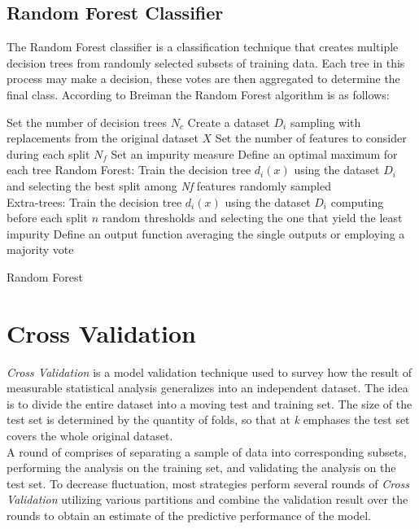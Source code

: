 \documentclass[a4paper, 11pt,titlepage,oneside,openany]{book}
\begin{document}
\subsection{Random Forest Classifier}
The Random Forest classifier is a classification technique that creates multiple decision trees from randomly selected subsets of training data. Each tree in this process may make a decision, these votes are then aggregated to determine the final class. According to Breiman \cite{randomforest} the Random Forest algorithm is as follows:\\

\begin{algorithm}[H]
	\DontPrintSemicolon
	Set the number of decision trees $N_c$\;
		{Create a dataset $D_i$ sampling with replacements from the original dataset $X$}
	Set the number of features  to consider during each split $N_f$\;
	Set an impurity measure\;
	Define an optimal maximum for each tree\;
		{Random Forest: Train the decision tree $d_i(x)$ using the dataset $D_i$ and selecting the best split among \textit{Nf} features randomly sampled \\
		Extra-trees:  Train the decision tree $d_i(x)$ using the dataset $D_i$ computing before each split $n$ random thresholds and selecting the one that yield the least impurity}
	Define an output function averaging the single outputs or employing a majority vote
	\caption{Random Forest}
\end{algorithm}
\section{Cross Validation}
\textit{Cross Validation} is a model validation technique used to survey how the result of measurable statistical analysis generalizes into an independent dataset. The idea is to divide the entire dataset into a moving test and training set. The size of the test set is determined by the quantity of folds, so that at \textit{k} emphases the test set covers the whole original dataset.\\
\noindent A round of  comprises of separating a sample of data into corresponding subsets, performing the analysis on the training set, and validating the analysis on the test set. To decrease fluctuation, most strategies perform several rounds of \textit{Cross Validation} utilizing various partitions and combine the validation result over the rounds to obtain an estimate of the predictive performance of the model.
\end{document}
